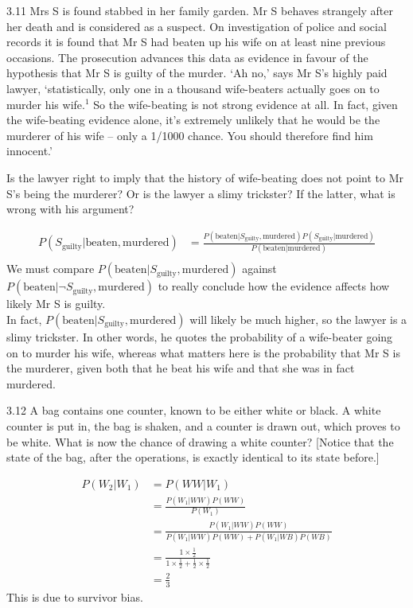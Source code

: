 \documentclass[12pt, a4paper]{article}
\begin{document}
\begin{prob}{3.11}
    Mrs S is found stabbed in her family garden. Mr S behaves strangely after her death and is considered as a suspect. On investigation of police and social records it is found that Mr S had beaten up his wife on at least nine previous occasions. The prosecution advances this data as evidence in favour of the hypothesis that Mr S is guilty of the murder. `Ah no,' says Mr S's highly paid lawyer, `statistically, only one in a thousand wife-beaters actually goes on to murder his wife.$^1$ So the wife-beating is not strong evidence at all. In fact, given the wife-beating evidence alone, it's extremely unlikely that he would be the murderer of his wife -- only a 1/1000 chance. You should therefore find him innocent.'
    
    Is the lawyer right to imply that the history of wife-beating does not point to Mr S's being the murderer? Or is the lawyer a slimy trickster? If the latter, what is wrong with his argument?
\end{prob}
\begin{sol}
    \begin{align*}
        P(S_{\text{guilty}} | \text{beaten}, \text{murdered}) &= \frac{P(\text{beaten} | S_{\text{guilty}}, \text{murdered})P(S_{\text{guilty}} | \text{murdered})}{P(\text{beaten} | \text{murdered})} \\
    \end{align*}
    We must compare $P(\text{beaten} | S_{\text{guilty}}, \text{murdered})$ against $P(\text{beaten} | \neg S_{\text{guilty}}, \text{murdered})$ to really conclude how the evidence affects how likely Mr S is guilty. \\
    In fact, $P(\text{beaten} | S_{\text{guilty}}, \text{murdered})$ will likely be much higher, so the lawyer is a slimy trickster. In other words, he quotes the probability of a wife-beater going on to murder his wife, whereas what matters here is the probability that Mr S is the murderer, given both that he beat his wife and that she was in fact murdered.
\end{sol}
\bigskip

\begin{prob}{3.12}
    A bag contains one counter, known to be either white or black. A white counter is put in, the bag is shaken, and a counter is drawn out, which proves to be white. What is now the chance of drawing a white counter? [Notice that the state of the bag, after the operations, is exactly identical to its state before.]
\end{prob}
\begin{sol}
    \begin{align*}
        P(W_2 | W_1) &= P(WW | W_1) \\
        &= \frac{P(W_1 | WW) P(WW)}{P(W_1)} \\
        &= \frac{P(W_1 | WW) P(WW)}{P(W_1 | WW) P(WW) + P(W_1 | WB) P(WB)} \\
        &= \frac{1 \times \frac{1}{2}}{1 \times \frac{1}{2} + \frac{1}{2} \times \frac{1}{2}} \\
        &= \frac{2}{3}
    \end{align*}
    This is due to survivor bias.
\end{sol}
\bigskip
\end{document}
